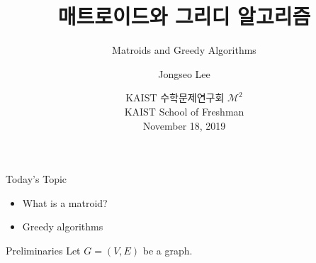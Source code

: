 \documentclass{beamer}
\title[About Beamer] %
{매트로이드와 그리디 알고리즘}
\subtitle{Matroids and Greedy Algorithms}
\author[] %
{Jongseo Lee}
\date[TWC 2019] %
{KAIST 수학문제연구회 $\mathcal{M}^2$\\KAIST School of Freshman\\November 18, 2019}
\begin{document}
\begin{frame}[plain]
\titlepage
\end{frame}

\begin{frame}[t]
{Today's Topic}

\begin{itemize}
    \item<1-> What is a matroid?
    \item<2-> Greedy algorithms
\end{itemize}

\end{frame}

\begin{frame}[t]
{Preliminaries}
Let $G = (V, E)$ be a graph.
\begin{center}
\end{center}
\end{frame}
\end{document}
